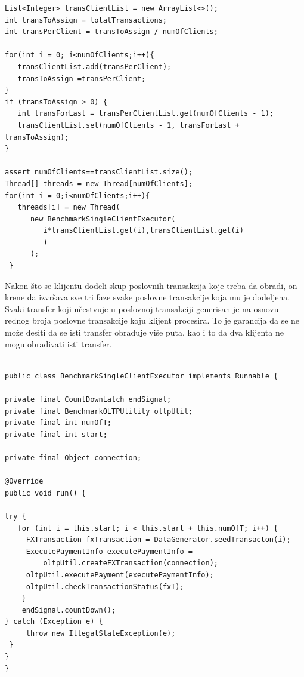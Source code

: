 \documentclass[12pt,oneside]{memoir}
\begin{document}
\begin{lstlisting}[title={Implementacija politike podele posla klijentima},captionpos=b]
List<Integer> transClientList = new ArrayList<>();
int transToAssign = totalTransactions;
int transPerClient = transToAssign / numOfClients;

for(int i = 0; i<numOfClients;i++){	
   transClientList.add(transPerClient);
   transToAssign-=transPerClient;
}
if (transToAssign > 0) {
   int transForLast = transPerClientList.get(numOfClients - 1);
   transClientList.set(numOfClients - 1, transForLast + transToAssign);
}

assert numOfClients==transClientList.size();
Thread[] threads = new Thread[numOfClients];
for(int i = 0;i<numOfClients;i++){
   threads[i] = new Thread(
      new BenchmarkSingleClientExecutor(
         i*transClientList.get(i),transClientList.get(i)
         )
      );
 }
\end{lstlisting}


Nakon što se klijentu dodeli skup poslovnih transakcija koje treba da obradi, on krene da izvršava sve tri faze svake poslovne transakcije koja mu je dodeljena. Svaki transfer koji učestvuje u poslovnoj transakciji generisan je na osnovu rednog broja poslovne transakcije koju klijent procesira. To je garancija da se ne može desiti da se isti transfer obrađuje više puta, kao i to da dva klijenta ne mogu obrađivati isti transfer.

\begin{lstlisting}[title={BenchmarkSingleClientExecutor.java - Posao klijenta},captionpos=b]

public class BenchmarkSingleClientExecutor implements Runnable {

private final CountDownLatch endSignal;
private final BenchmarkOLTPUtility oltpUtil;
private final int numOfT;
private final int start;

private final Object connection;

@Override
public void run() {

try {
   for (int i = this.start; i < this.start + this.numOfT; i++) {
     FXTransaction fxTransaction = DataGenerator.seedTransacton(i);
     ExecutePaymentInfo executePaymentInfo = 
         oltpUtil.createFXTransaction(connection);
     oltpUtil.executePayment(executePaymentInfo);
     oltpUtil.checkTransactionStatus(fxT);
    }
    endSignal.countDown();
} catch (Exception e) {
     throw new IllegalStateException(e);
 }
}
}
\end{lstlisting}
\end{document}
